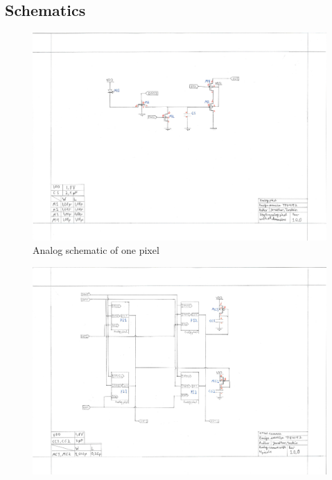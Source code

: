 \documentclass[a4paper, 12pt, english]{article}
\begin{document}
\newpage
\begin{appendices}
  

  \section{Schematics} \label{ap:Schematics}
  \begin{figure}[H]
    \centering
    \includegraphics[angle=-90, scale=0.45]{figures/SchematicPixel.pdf}
    \caption{Analog schematic of one pixel}
    \label{fig:analogPixel}
  \end{figure}
  \begin{figure}[H]
    \centering
    \includegraphics[angle=-90, scale=0.51]{figures/SchematicCamera.pdf}

\end{figure}
\end{appendices}
\end{document}
